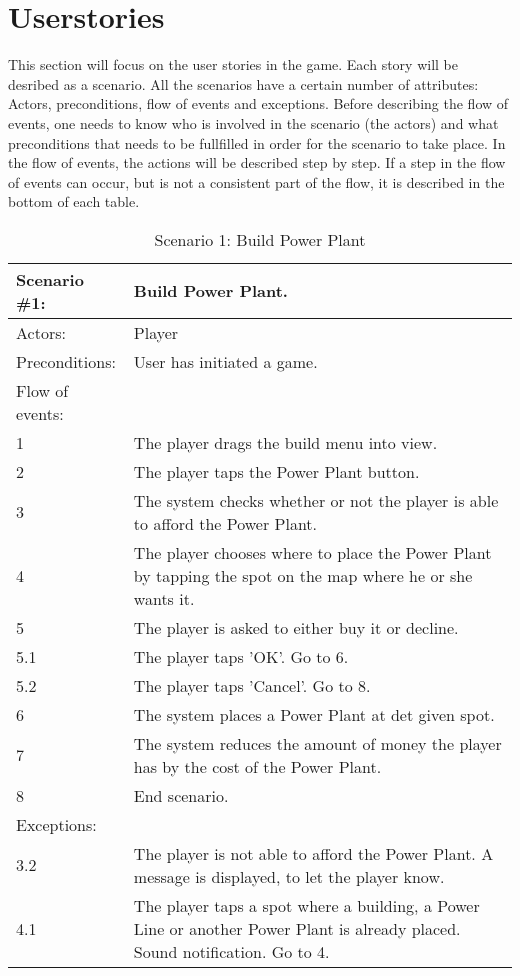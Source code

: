 \section{Userstories}

This section will focus on the user stories in the game. Each story will be desribed as a scenario. All the scenarios have a certain number of attributes: Actors, preconditions, flow of events and exceptions. Before describing the flow of events, one needs to know who is involved in the scenario (the actors) and what preconditions that needs to be fullfilled in order for the scenario to take place. In the flow of events, the actions will be described step by step. If a step in the flow of events can occur, but is not a consistent part of the flow, it is described in the bottom of each table.\\


\begin{table}[H]
	\begin{tabular}{| l | p{10cm} |}
		\hline
		\rowcolor{lightgray}
		{\bf Scenario \#1:} & {\bf Build Power Plant.} \\ \hline
		Actors: & Player \\ \hline
		Preconditions: & User has initiated a game. \\ \hline
		\rowcolor{lightergray}
		Flow of events: &  \\ \hline
		1 & The player drags the build menu into view. \\ \hline
		2 & The player taps the Power Plant button. \\ \hline
		3 & The system checks whether or not the player is able to afford the Power Plant. \\ \hline
		4 & The player chooses where to place the Power Plant by tapping the spot on the map where he or she wants it. \\ \hline
		5 & The player is asked to either buy it or decline. \\ \hline
		5.1 & The player taps 'OK'. Go to 6. \\ \hline
		5.2 & The player taps 'Cancel'. Go to 8. \\ \hline
		6 & The system places a Power Plant at det given spot. \\ \hline
		7 & The system reduces the amount of money the player has by the cost of the Power Plant. \\ \hline
		8 & End scenario. \\ \hline
		\rowcolor{lightergray}
		Exceptions: & \\ \hline
		3.2 & The player is not able to afford the Power Plant. A message is displayed, to let the player know. \\ \hline
		4.1 & The player taps a spot where a building, a Power Line or another Power Plant is already placed. Sound notification. Go to 4. \\ \hline
	\end{tabular}
\caption{Scenario 1: Build Power Plant}
\end{table}

